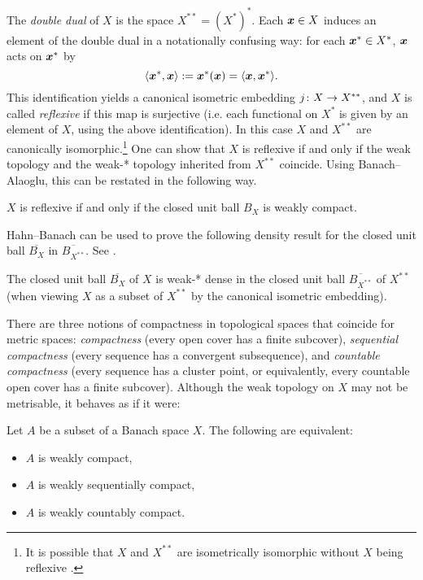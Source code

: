 The \emph{double dual} of $X$ is the space $X^{**} = (X^*)^*$.
Each $\bm{x} \in X$ induces an element of the double dual in a notationally confusing way: for each $\bm{x}^* \in X^*$, $\bm{x}$ acts on $\bm{x}^*$ by
\begin{equation*}
  \langle \bm{x}^*, \bm{x} \rangle := \bm{x}^*(\bm{x}) = \langle \bm{x}, \bm{x}^* \rangle.
\end{equation*}
This identification yields a canonical isometric embedding $j \colon X \rightarrow X^{**}$, and $X$ is called \emph{reflexive} if this map is surjective (i.e. each functional on $X^*$ is given by an element of $X$, using the above identification).
In this case $X$ and $X^{**}$ are canonically isomorphic.\footnote{It is possible that $X$ and $X^{**}$ are isometrically isomorphic without $X$ being reflexive \cite{rJ51}.}
One can show that $X$ is reflexive if and only if the weak topology and the weak-* topology inherited from $X^{**}$ coincide.
Using Banach--Alaoglu, this can be restated in the following way.

\begin{cor}\label{cor:reflexive-iff-weakcpt}
  $X$ is reflexive if and only if the closed unit ball $B_{X}$ is weakly compact.
\end{cor}

Hahn--Banach can be used to prove the following density result for the closed unit ball $\overline{B_{X}}$ in $\overline{B_{X^{**}}}$.
See \cite[Proposition B.1.17]{HNVW16}.

\begin{thm}[Goldstine]\label{thm:goldstine}
  The closed unit ball $\overline{B_{X}}$ of $X$ is weak-* dense in the closed unit ball $\overline{B_{X^{**}}}$ of $X^{**}$ (when viewing $X$ as a subset of $X^{**}$ by the canonical isometric embedding).
\end{thm}

There are three notions of compactness in topological spaces that coincide for metric spaces: \emph{compactness} (every open cover has a finite subcover), \emph{sequential compactness} (every sequence has a convergent subsequence), and \emph{countable compactness} (every sequence has a cluster point, or equivalently, every countable open cover has a finite subcover).
Although the weak topology on $X$ may not be metrisable, it behaves as if it were:

\begin{thm}\label{thm:eberlein-smulian}
  Let $A$ be a subset of a Banach space $X$.
  The following are equivalent:
  \begin{itemize}
  \item $A$ is weakly compact,
  \item $A$ is weakly sequentially compact,
  \item $A$ is weakly countably compact.
  \end{itemize}
\end{thm}

